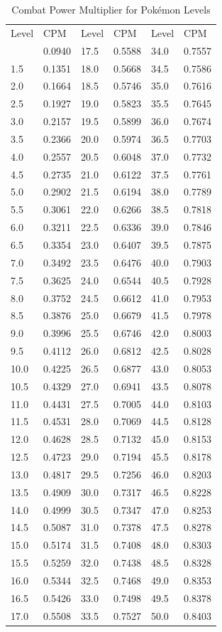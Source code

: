 \begin{table}
\centering
\begin{tabular}{l l|l l|l l}
Level & CPM & Level & CPM & Level & CPM \\
\Midrule
1.0 & 0.0940 & 17.5 & 0.5588 & 34.0 & 0.7557 \\ 
1.5 & 0.1351 & 18.0 & 0.5668 & 34.5 & 0.7586 \\
2.0 & 0.1664 & 18.5 & 0.5746 & 35.0 & 0.7616 \\
2.5 & 0.1927 & 19.0 & 0.5823 & 35.5 & 0.7645 \\
3.0 & 0.2157 & 19.5 & 0.5899 & 36.0 & 0.7674 \\
3.5 & 0.2366 & 20.0 & 0.5974 & 36.5 & 0.7703 \\
4.0 & 0.2557 & 20.5 & 0.6048 & 37.0 & 0.7732 \\
4.5 & 0.2735 & 21.0 & 0.6122 & 37.5 & 0.7761 \\
5.0 & 0.2902 & 21.5 & 0.6194 & 38.0 & 0.7789 \\
5.5 & 0.3061 & 22.0 & 0.6266 & 38.5 & 0.7818 \\
6.0 & 0.3211 & 22.5 & 0.6336 & 39.0 & 0.7846 \\
6.5 & 0.3354 & 23.0 & 0.6407 & 39.5 & 0.7875 \\
7.0 & 0.3492 & 23.5 & 0.6476 & 40.0 & 0.7903 \\
7.5 & 0.3625 & 24.0 & 0.6544 & 40.5 & 0.7928 \\
8.0 & 0.3752 & 24.5 & 0.6612 & 41.0 & 0.7953 \\
8.5 & 0.3876 & 25.0 & 0.6679 & 41.5 & 0.7978 \\
9.0 & 0.3996 & 25.5 & 0.6746 & 42.0 & 0.8003 \\
9.5 & 0.4112 & 26.0 & 0.6812 & 42.5 & 0.8028 \\
10.0 & 0.4225 & 26.5 & 0.6877 & 43.0 & 0.8053 \\
10.5 & 0.4329 & 27.0 & 0.6941 & 43.5 & 0.8078 \\
11.0 & 0.4431 & 27.5 & 0.7005 & 44.0 & 0.8103 \\
11.5 & 0.4531 & 28.0 & 0.7069 & 44.5 & 0.8128 \\
12.0 & 0.4628 & 28.5 & 0.7132 & 45.0 & 0.8153 \\
12.5 & 0.4723 & 29.0 & 0.7194 & 45.5 & 0.8178 \\
13.0 & 0.4817 & 29.5 & 0.7256 & 46.0 & 0.8203 \\
13.5 & 0.4909 & 30.0 & 0.7317 & 46.5 & 0.8228 \\
14.0 & 0.4999 & 30.5 & 0.7347 & 47.0 & 0.8253 \\
14.5 & 0.5087 & 31.0 & 0.7378 & 47.5 & 0.8278 \\
15.0 & 0.5174 & 31.5 & 0.7408 & 48.0 & 0.8303 \\
15.5 & 0.5259 & 32.0 & 0.7438 & 48.5 & 0.8328 \\
16.0 & 0.5344 & 32.5 & 0.7468 & 49.0 & 0.8353 \\
16.5 & 0.5426 & 33.0 & 0.7498 & 49.5 & 0.8378 \\
17.0 & 0.5508 & 33.5 & 0.7527 & 50.0 & 0.8403 \\
\end{tabular}
\caption{Combat Power Multiplier for Pokémon Levels\label{table:cpm}}
\end{table}

